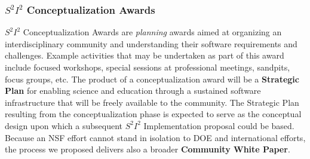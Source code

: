 \begin{frame}
\frametitle{$ S^2 I^2 $ Conceptualization Awards}

$ S^2 I^2 $ Conceptualization Awards are {\em planning} awards aimed at organizing an interdisciplinary community and understanding their software requirements and challenges. 
Example activities that may be undertaken as part of this award include focused workshops, special sessions at professional meetings, sandpits, focus groups, etc. 
\vskip 0.12in
The product of a conceptualization award will be a {\bf Strategic Plan} for enabling science and education through a sustained software infrastructure that will be freely available to the community. 
\vskip 0.12in
The Strategic Plan resulting from the conceptualization phase is expected to serve as the conceptual design upon which a subsequent $ S^2 I^2 $ Implementation proposal could be based.
\vskip 0.12in
Because an NSF effort cannot stand in isolation to DOE and international efforts, the process we proposed delivers also a broader {\bf Community White Paper}.

\end{frame}


